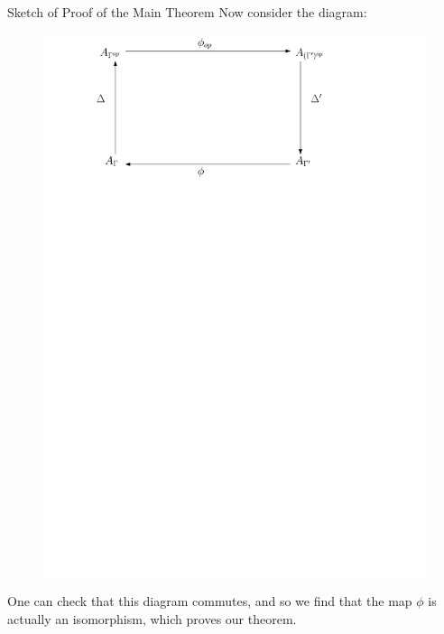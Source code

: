 \documentclass{beamer}
\begin{document}
\begin{frame}{Sketch of Proof of the Main Theorem}
Now consider the diagram:
\begin{figure}
\includegraphics[scale = .50]{Comm-Diag.pdf}
\end{figure}
One can check that this diagram commutes, and so we find that the map $\phi$ is actually an isomorphism, which proves our theorem.
\end{frame}
\end{document}
